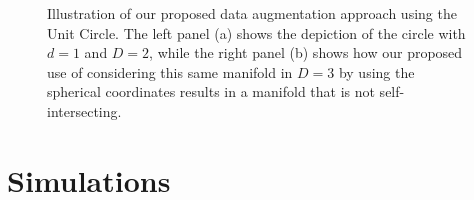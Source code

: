 \documentclass[11pt,reqno]{article}
\theoremstyle{definition}
\begin{document}
\begin{figure}%
  \centering
  \hfill
  \caption{Illustration of our proposed data augmentation approach using the Unit Circle. The left panel (a) shows the depiction of the circle with $d=1$ and $D=2$, while the right panel (b) shows how our proposed use of considering this same manifold in $D=3$ by using the spherical coordinates results in a manifold that is not self-intersecting.}
  \label{fig:unit_circle_augmentation}
\end{figure}




\section{Simulations}\label{s:simulations}
\end{document}
